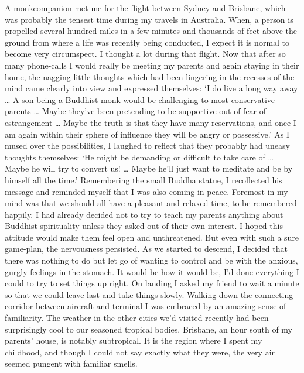 A monkcompanion met me for the flight between Sydney and Brisbane, which
was probably the tensest time during my travels in Australia. When, a
person is propelled several hundred miles in a few minutes and thousands
of feet above the ground from where a life was recently being conducted,
I expect it is normal to become very circumspect. I thought a lot during
that flight. Now that after so many phone-calls I would really be
meeting my parents and again staying in their home, the nagging little
thoughts which had been lingering in the recesses of the mind came
clearly into view and expressed themselves: `I do live a long way away
\ldots{} A son being a Buddhist monk would be challenging to most
conservative parents \ldots{} Maybe they've been pretending to be
supportive out of fear of estrangement \ldots{} Maybe the truth is that
they have many reservations, and once I am again within their sphere of
influence they will be angry or possessive.' As I mused over the
possibilities, I laughed to reflect that they probably had uneasy
thoughts themselves: `He might be demanding or difficult to take care of
\ldots{} Maybe he will try to convert us! \ldots{} Maybe he'll just want
to meditate and be by himself all the time.' Remembering the small
Buddha statue, I recollected his message and reminded myself that I was
also coming in peace. Foremost in my mind was that we should all have a
pleasant and relaxed time, to be remembered happily. I had already
decided not to try to teach my parents anything about Buddhist
spirituality unless they asked out of their own interest. I hoped this
attitude would make them feel open and unthreatened. But even with such
a sure game-plan, the nervousness persisted. As we started to descend, I
decided that there was nothing to do but let go of wanting to control
and be with the anxious, gurgly feelings in the stomach. It would be how
it would be, I'd done everything I could to try to set things up right.
On landing I asked my friend to wait a minute so that we could leave
last and take things slowly. Walking down the connecting corridor
between aircraft and terminal I was embraced by an amazing sense of
familiarity. The weather in the other cities we'd visited recently had
been surprisingly cool to our seasoned tropical bodies. Brisbane, an
hour south of my parents' house, is notably subtropical. It is the
region where I spent my childhood, and though I could not say exactly
what they were, the very air seemed pungent with familiar smells.

